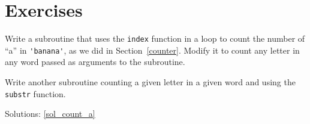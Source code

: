 \section{Exercises}


\begin{exercise}
\label{count_a}

Write a subroutine that uses the {\tt index} function in a 
loop to count the number of ``a'' in \verb"'banana'",
as we did in Section~\ref{counter}. Modify it to count 
any letter in any word passed as arguments to the subroutine.

Write another subroutine counting a given letter in a given 
word and using the {\tt substr} function.

Solutions: \ref{sol_count_a}
\end{exercise}


